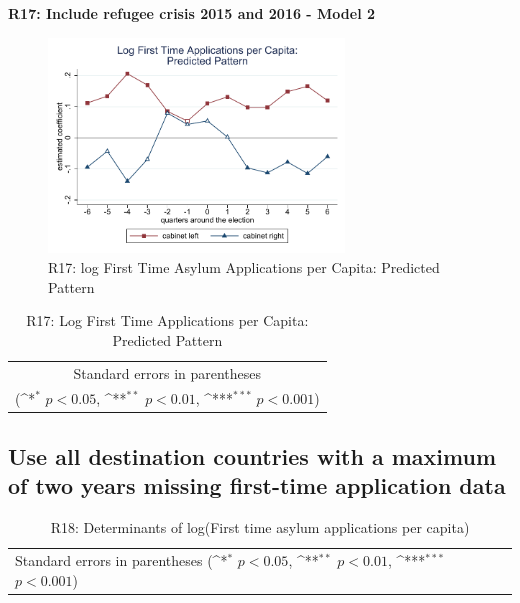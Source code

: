 \documentclass[10pt,a4paper]{scrartcl}
\begin{document}
\clearpage
\textbf{R17: Include refugee crisis 2015 and 2016 - Model 2}
\begin{figure}[!ht]
	\centering
	\includegraphics[width=0.7\textwidth]{figures_edited/app_graph2_R17.pdf}
	\caption{R17: log First Time Asylum Applications per Capita: Predicted Pattern}
\end{figure}

\begin{table}[!ht]\centering
	\footnotesize
	\renewcommand{\arraystretch}{1.2}
	\def\sym#1{\ifmmode^{#1}\else\(^{#1}\)\fi}
	\caption{R17: Log First Time Applications per Capita: Predicted Pattern}
	\begin{tabular}{l*{2}{c}}
		\hline\hline
		
		\hline\hline
		\multicolumn{3}{c}{\footnotesize Standard errors in parentheses} \\
		\multicolumn{3}{c}{\footnotesize (\sym{*} \(p<0.05\), \sym{**} \(p<0.01\), \sym{***} \(p<0.001\))} \\
	\end{tabular}
\end{table}






\clearpage
\FloatBarrier
\subsection{Use all destination countries with a maximum of two years missing first-time application data}
\begin{table}[!ht]\centering
	\renewcommand{\arraystretch}{1.25}
	\small
	\def\sym#1{\ifmmode^{#1}\else\(^{#1}\)\fi}
	\caption{R18: Determinants of log(First time asylum applications per capita)}
	\begin{tabular}{l*{3}{c}}
		\hline\hline
		
		\hline\hline
		\multicolumn{4}{l}{\footnotesize Standard errors in parentheses (\sym{*} \(p<0.05\), \sym{**} \(p<0.01\), \sym{***} \(p<0.001\))}\\
	\end{tabular}
\end{table}
\end{document}
